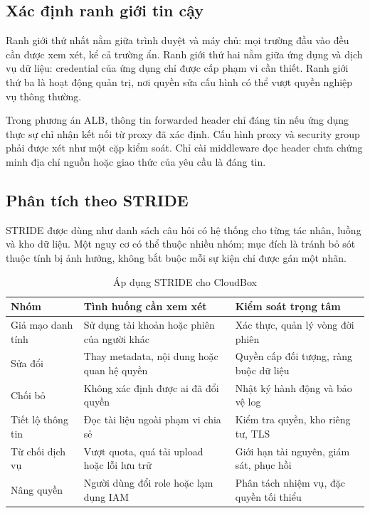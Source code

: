 \subsection{Xác định ranh giới tin cậy}
Ranh giới thứ nhất nằm giữa trình duyệt và máy chủ: mọi trường đầu vào đều cần được xem xét, kể cả trường ẩn. Ranh giới thứ hai nằm giữa ứng dụng và dịch vụ dữ liệu: credential của ứng dụng chỉ được cấp phạm vi cần thiết. Ranh giới thứ ba là hoạt động quản trị, nơi quyền sửa cấu hình có thể vượt quyền nghiệp vụ thông thường.

Trong phương án ALB, thông tin forwarded header chỉ đáng tin nếu ứng dụng thực sự chỉ nhận kết nối từ proxy đã xác định. Cấu hình proxy và security group phải được xét như một cặp kiểm soát. Chỉ cài middleware đọc header chưa chứng minh địa chỉ nguồn hoặc giao thức của yêu cầu là đáng tin.
\subsection{Phân tích theo STRIDE}
STRIDE được dùng như danh sách câu hỏi có hệ thống cho từng tác nhân, luồng và kho dữ liệu. Một nguy cơ có thể thuộc nhiều nhóm; mục đích là tránh bỏ sót thuộc tính bị ảnh hưởng, không bắt buộc mỗi sự kiện chỉ được gán một nhãn.
\begin{table}[htbp]\centering\small
\caption{Áp dụng STRIDE cho CloudBox}
\begin{tabularx}{\textwidth}{P{3cm}XX}\toprule
\textbf{Nhóm} & \textbf{Tình huống cần xem xét} & \textbf{Kiểm soát trọng tâm}\\\midrule
Giả mạo danh tính & Sử dụng tài khoản hoặc phiên của người khác & Xác thực, quản lý vòng đời phiên\\
Sửa đổi & Thay metadata, nội dung hoặc quan hệ quyền & Quyền cấp đối tượng, ràng buộc dữ liệu\\
Chối bỏ & Không xác định được ai đã đổi quyền & Nhật ký hành động và bảo vệ log\\
Tiết lộ thông tin & Đọc tài liệu ngoài phạm vi chia sẻ & Kiểm tra quyền, kho riêng tư, TLS\\
Từ chối dịch vụ & Vượt quota, quá tải upload hoặc lỗi lưu trữ & Giới hạn tài nguyên, giám sát, phục hồi\\
Nâng quyền & Người dùng đổi role hoặc lạm dụng IAM & Phân tách nhiệm vụ, đặc quyền tối thiểu\\\bottomrule
\end{tabularx}\end{table}

